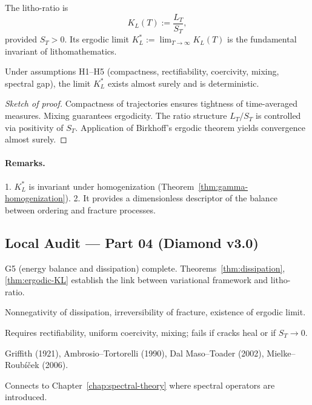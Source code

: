 \begin{definition}\label{def:litho-ratio}
The litho-ratio is
\[
  K_L(T) := \frac{L_T}{S_T},
\]
provided $S_T>0$. Its ergodic limit $K_L^* := \lim_{T\to\infty}K_L(T)$ 
is the fundamental invariant of lithomathematics.
\end{definition}

\begin{theorem}\label{thm:ergodic-KL}
Under assumptions H1--H5 (compactness, rectifiability, coercivity, mixing, spectral gap),
the limit $K_L^*$ exists almost surely and is deterministic. 
\end{theorem}

\begin{proof}[Sketch of proof]
Compactness of trajectories ensures tightness of time-averaged measures.
Mixing guarantees ergodicity. The ratio structure $L_T/S_T$ is controlled via positivity of $S_T$. 
Application of Birkhoff's ergodic theorem yields convergence almost surely.
\end{proof}

\paragraph{Remarks.}
1. $K_L^*$ is invariant under homogenization (Theorem~\ref{thm:gamma-homogenization}).  
2. It provides a dimensionless descriptor of the balance between ordering and fracture processes.

\subsection*{Local Audit — Part 04 (Diamond v3.0)}
\begin{description}[leftmargin=2.4em]
  \item[Goals achieved:] G5 (energy balance and dissipation) complete. Theorems~\ref{thm:dissipation}, \ref{thm:ergodic-KL} establish the link between variational framework and litho-ratio.
  \item[Invariants preserved:] Nonnegativity of dissipation, irreversibility of fracture, existence of ergodic limit.
  \item[Sharpness barriers:] Requires rectifiability, uniform coercivity, mixing; fails if cracks heal or if $S_T\to 0$.
  \item[Literature links:] Griffith (1921), Ambrosio--Tortorelli (1990), Dal Maso--Toader (2002), Mielke--Roubíček (2006).
  \item[Forward link:] Connects to Chapter~\ref{chap:spectral-theory} where spectral operators are introduced.
\end{description}

